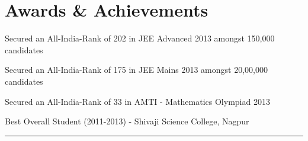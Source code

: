 \documentclass[letterpaper]{Formatting}
\begin{document}
\begin{minipage}[t]{0.66\textwidth}
\vspace{3.9ex}
\section{Awards \& Achievements} 
\vspace{\topsep}
\small{
\begin{tightitemize}
\item Secured an All-India-Rank of 202 in JEE Advanced 2013 amongst 150,000 candidates\\
\item Secured an All-India-Rank of 175 in JEE Mains 2013 amongst 20,00,000 candidates\\
\item Secured an All-India-Rank of 33 in AMTI - Mathematics Olympiad 2013\\
\item Best Overall Student (2011-2013) - Shivaji Science College, Nagpur \\
\end{tightitemize}
}
\sectionspace %
\vspace{2ex}
\rule{12cm}{0.25pt}
\end{minipage} %







\end{document}
